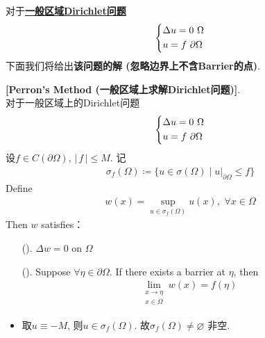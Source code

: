 	\vspace*{6em}
	
	对于\underline{\textbf{一般区域Dirichlet问题}}
	\begin{align*}
		\begin{dcases*}
			\Delta u = 0 \,\, \Omega \\
			u = f \,\, \partial \Omega
		\end{dcases*}
	\end{align*}
	下面我们将给出\textbf{该问题的解 (忽略边界上不含Barrier的点)}. 
	
	\newpage
	
	\begin{thm}\label{thm 3.6.5}
		\textbf{[Perron's Method (一般区域上求解Dirichlet问题)]}. \\
		对于一般区域上的Dirichlet问题
		\begin{align*}
			\begin{dcases*}
				\Delta u = 0 \,\, \Omega \\
				u = f \,\, \partial \Omega
			\end{dcases*}
		\end{align*}
		设$f \in C(\partial \Omega)$, $| \, f \, | \leq M$. 记
		\begin{align*}
			\sigma_{f}(\Omega) \coloneqq \Big\{ u \in \sigma(\Omega) \mid u \Big|_{\partial \Omega} \leq f \Big\}
		\end{align*}
		Define 
		\begin{align*}
			w(x) = \sup_{u \in \sigma_{f}(\Omega)} u(x) , \,\, \forall x \in \Omega
		\end{align*}
		Then $w$ satisfies：
		
		\begin{enumerate}
			\item[(\rmnum{1}).] $\Delta w = 0$ on $\Omega$ 
			
			\item[(\rmnum{2}).] Suppose $\forall \eta \in \partial \Omega$. If there exists a barrier at $\eta$, then
			\begin{align*}
				\lim_{\substack{x \to \eta \\ x \in \Omega}} w(x) = f(\eta)
			\end{align*}
		\end{enumerate}
		
		\vspace*{8em}
		
		\begin{rmk}
			\begin{itemize}
				\item 取$u \equiv -M$, 则$u \in \sigma_{f}(\Omega)$. 故$\sigma_{f}(\Omega) \neq \varnothing$ 非空. 
				

\end{itemize}
\end{rmk}
\end{thm}

